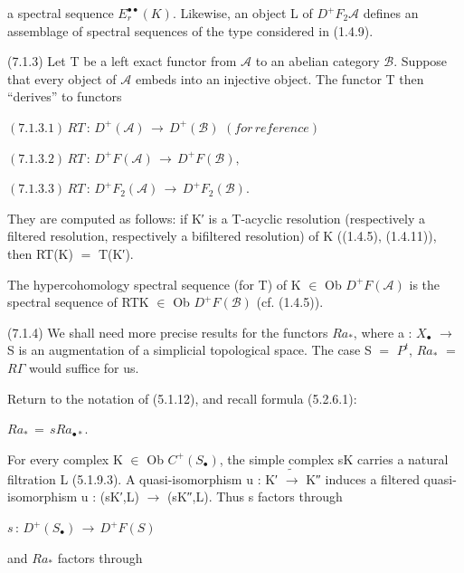 \documentclass[11pt,twoside]{article}
\newcommand{\DFormula}[1]{%
  \par\smallskip\noindent\hspace*{0pt}\(\displaystyle #1\)\par\smallskip
}
\begin{document}
a spectral sequence \(E_{r}^{\bullet \bullet }(K)\). Likewise, an object L of \(D^{+}F_{2}𝒜\) defines an assemblage of spectral sequences of the type considered in (1.4.9).\par
\par\medskip
(7.1.3) Let T be a left exact functor from \(𝒜\) to an abelian category \(\mathcal{B}\). Suppose that every object of \(𝒜\) embeds into an injective object. The functor T then “derives” to functors\par
\par\medskip
\DFormula{(7.1.3.1)\,RT\,:\,D^{+}(𝒜)\,\to \,D^{+}(\mathcal{B})\,\,(for\,reference)}
\par\medskip
\DFormula{(7.1.3.2)\,RT\,:\,D^{+}F(𝒜)\,\to \,D^{+}F(\mathcal{B}),}
\par\medskip
\DFormula{(7.1.3.3)\,RT\,:\,D^{+}F_{2}(𝒜)\,\to \,D^{+}F_{2}(\mathcal{B}).}
\par\medskip
They are computed as follows: if K′ is a T-acyclic resolution (respectively a filtered resolution, respectively a bifiltered resolution) of K ((1.4.5), (1.4.11)), then RT(K) \(=\) T(K′).\par
\par\medskip
The hypercohomology spectral sequence (for T) of K \(\in \) Ob \(D^{+}F(𝒜)\) is the spectral sequence of RTK \(\in \) Ob \(D^{+}F(\mathcal{B})\) (cf. (1.4.5)).\par
\par\medskip
(7.1.4) We shall need more precise results for the functors \(Ra_{\ast }\), where a : \(X_{\bullet }\) \(\to \) S is an augmentation of a simplicial topological space. The case S \(=\) \(P^{t}\), \(Ra_{\ast }\) \(=\) \(R\Gamma \) would suffice for us.\par
\par\medskip
Return to the notation of (5.1.12), and recall formula (5.2.6.1):\par
\par\medskip
\DFormula{Ra_{\ast }\,=\,sRa_{\bullet \ast }.}
\par\medskip
For every complex K \(\in \) Ob \(C^{+}(S_{\bullet })\), the simple complex sK carries a natural filtration L (5.1.9.3). A quasi-isomorphism u : K′ \(\widetilde{\to }\) K″ induces a filtered quasi-isomorphism u : (sK′,L) \(\to \) (sK″,L). Thus s factors through\par
\par\medskip
\DFormula{s\,:\,D^{+}(S_{\bullet })\,\to \,D^{+}F(S)}
\par\medskip
and \(Ra_{\ast }\) factors through\par
\end{document}

